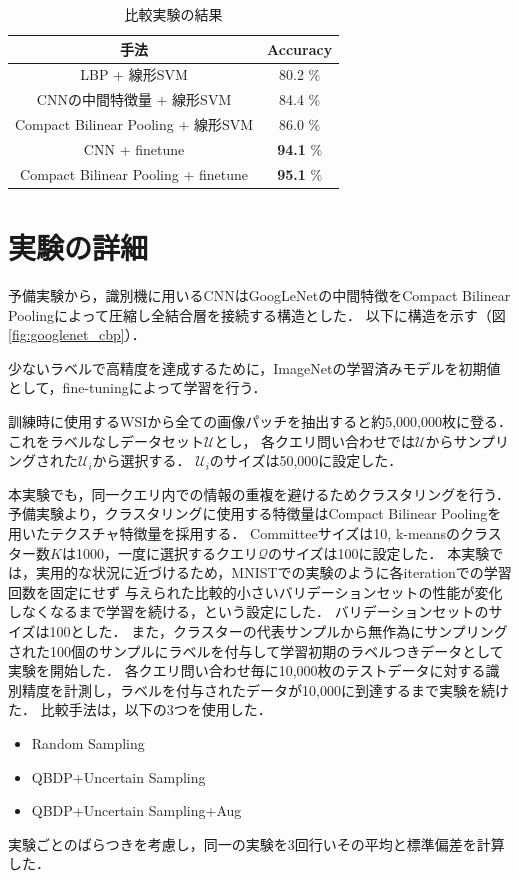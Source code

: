 \begin{table}[h]
  \caption{\label{table:compare_classifier}比較実験の結果}
  \center
  \begin{tabular}{c|c} \hline
    手法 & Accuracy  \\ \hline
    LBP + 線形SVM & 80.2 $\%$ \\
    CNNの中間特徴量 + 線形SVM & 84.4 $\%$  \\ 
    Compact Bilinear Pooling + 線形SVM & 86.0 $\%$ \\ \hline
    CNN + finetune & \textbf{94.1} $\%$  \\ 
    Compact Bilinear Pooling + finetune & \textbf{95.1} $\%$ \\ \hline
  \end{tabular}
\end{table}


\section{実験の詳細}
予備実験から，識別機に用いるCNNはGoogLeNetの中間特徴をCompact Bilinear Poolingによって圧縮し全結合層を接続する構造とした．
以下に構造を示す（図\ref{fig:googlenet_cbp}）．

少ないラベルで高精度を達成するために，ImageNetの学習済みモデルを初期値として，fine-tuningによって学習を行う．

訓練時に使用するWSIから全ての画像パッチを抽出すると約5,000,000枚に登る．これをラベルなしデータセット$\mathcal{U}$とし，
各クエリ問い合わせでは$\mathcal{U}$からサンプリングされた$\mathcal{U}_i$から選択する．
$\mathcal{U}_i$のサイズは50,000に設定した．

本実験でも，同一クエリ内での情報の重複を避けるためクラスタリングを行う．
予備実験より，クラスタリングに使用する特徴量はCompact Bilinear Poolingを用いたテクスチャ特徴量を採用する．
Committeeサイズは10, k-meansのクラスター数$K$は1000，一度に選択するクエリ$\mathcal{Q}$のサイズは100に設定した．
本実験では，実用的な状況に近づけるため，MNISTでの実験のように各iterationでの学習回数を固定にせず
与えられた比較的小さいバリデーションセットの性能が変化しなくなるまで学習を続ける，という設定にした．
バリデーションセットのサイズは100とした．
また，クラスターの代表サンプルから無作為にサンプリングされた100個のサンプルにラベルを付与して学習初期のラベルつきデータとして実験を開始した．
各クエリ問い合わせ毎に10,000枚のテストデータに対する識別精度を計測し，ラベルを付与されたデータが10,000に到達するまで実験を続けた．
比較手法は，以下の3つを使用した．
\begin{itemize}
  \item Random Sampling
  \item QBDP+Uncertain Sampling
  \item QBDP+Uncertain Sampling+Aug
\end{itemize}
実験ごとのばらつきを考慮し，同一の実験を3回行いその平均と標準偏差を計算した．

